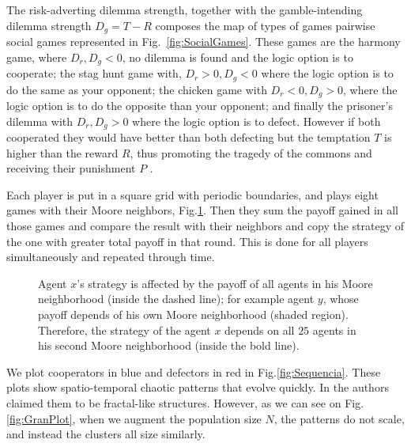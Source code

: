 The risk-adverting dilemma strength, together with the gamble-intending dilemma strength $D_g = T - R$ composes the map of types of games pairwise social games represented in Fig.~\ref{fig:SocialGames}. These games are the harmony game, where $D_r,D_g < 0$, no dilemma is found and the logic option is to cooperate; the stag hunt game with, $D_r > 0, D_g < 0$ where the logic option is to do the same as your opponent; the chicken game with $D_r < 0, D_g > 0$, where the logic option is to do the opposite than your opponent; and finally the prisoner's dilemma with $D_r,D_g > 0$ where the logic option is to defect. However if both cooperated they would have better than both defecting but the temptation $T$ is higher than the reward $R$, thus promoting the tragedy of the commons and receiving their punishment $P$ \cite{TragedyCommons}.

Each player is put in a square grid with periodic boundaries, and plays eight games with their Moore neighbors, Fig.\ref{fig:Moore2Neigh}. Then they sum the payoff gained in all those games and compare the result with their neighbors and copy the strategy of the one with greater total payoff in that round. This is done for all players simultaneously and repeated through time. 


\begin{figure}
\centering
{}
\caption{Agent $x$'s strategy is affected by the payoff of all agents in his Moore neighborhood (inside the dashed line); for example agent $y$, whose payoff depends of his own Moore neighborhood (shaded region). Therefore, the strategy of the agent $x$ depends on all $25$ agents in his second Moore neighborhood (inside the bold line).}
\label{fig:Moore2Neigh}
\end{figure}





We plot cooperators in blue and defectors in red in Fig.\ref{fig:Sequencia}. These plots show spatio-temporal chaotic patterns that evolve quickly. In \cite{SpatialChaos} the authors claimed them to be fractal-like structures. However, as we can see on Fig.\ref{fig:GranPlot}, when we augment the population size $N$, the patterns do not scale, and instead the clusters all size similarly.




